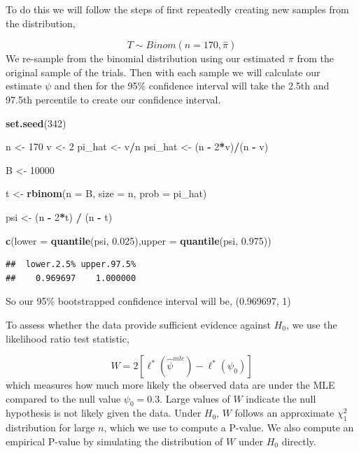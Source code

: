\documentclass[
  11pt,
]{article}
\newenvironment{Shaded}{\begin{snugshade}}{\end{snugshade}}
\newcommand{\AttributeTok}[1]{\textcolor[rgb]{0.13,0.29,0.53}{#1}}
\newcommand{\DecValTok}[1]{\textcolor[rgb]{0.00,0.00,0.81}{#1}}
\newcommand{\FloatTok}[1]{\textcolor[rgb]{0.00,0.00,0.81}{#1}}
\newcommand{\FunctionTok}[1]{\textcolor[rgb]{0.13,0.29,0.53}{\textbf{#1}}}
\newcommand{\NormalTok}[1]{#1}
\newcommand{\OtherTok}[1]{\textcolor[rgb]{0.56,0.35,0.01}{#1}}
\newcommand{\SpecialCharTok}[1]{\textcolor[rgb]{0.81,0.36,0.00}{\textbf{#1}}}
\begin{document}
To do this we will follow the steps of first repeatedly creating new
samples from the distribution,

\[T \sim Binom(n = 170,  \hat \pi)\] We re-sample from the binomial
distribution using our estimated \(\pi\) from the original sample of the
trials. Then with each sample we will calculate our estimate \(\psi\)
and then for the 95\% confidence interval will take the 2.5th and 97.5th
percentile to create our confidence interval.

\begin{Shaded}
\begin{Highlighting}[]
\FunctionTok{set.seed}\NormalTok{(}\DecValTok{342}\NormalTok{)}

\NormalTok{n }\OtherTok{\textless{}{-}} \DecValTok{170}
\NormalTok{v }\OtherTok{\textless{}{-}} \DecValTok{2}
\NormalTok{pi\_hat }\OtherTok{\textless{}{-}}\NormalTok{ v}\SpecialCharTok{/}\NormalTok{n}
\NormalTok{psi\_hat }\OtherTok{\textless{}{-}}\NormalTok{ (n }\SpecialCharTok{{-}} \DecValTok{2}\SpecialCharTok{*}\NormalTok{v)}\SpecialCharTok{/}\NormalTok{(n }\SpecialCharTok{{-}}\NormalTok{ v)}

\NormalTok{B }\OtherTok{\textless{}{-}} \DecValTok{10000}

\NormalTok{t }\OtherTok{\textless{}{-}} \FunctionTok{rbinom}\NormalTok{(}\AttributeTok{n =}\NormalTok{ B, }\AttributeTok{size =}\NormalTok{ n, }\AttributeTok{prob =}\NormalTok{ pi\_hat)}

\NormalTok{psi }\OtherTok{\textless{}{-}}\NormalTok{ (n }\SpecialCharTok{{-}} \DecValTok{2}\SpecialCharTok{*}\NormalTok{t) }\SpecialCharTok{/}\NormalTok{ (n }\SpecialCharTok{{-}}\NormalTok{ t)}

\FunctionTok{c}\NormalTok{(}\AttributeTok{lower =} \FunctionTok{quantile}\NormalTok{(psi, }\FloatTok{0.025}\NormalTok{),}\AttributeTok{upper =} \FunctionTok{quantile}\NormalTok{(psi, }\FloatTok{0.975}\NormalTok{))}
\end{Highlighting}
\end{Shaded}

\begin{verbatim}
##  lower.2.5% upper.97.5% 
##    0.969697    1.000000
\end{verbatim}

So our 95\% bootstrapped confidence interval will be, (0.969697, 1)

To assess whether the data provide sufficient evidence against \(H_0\),
we use the likelihood ratio test statistic,

\[W = 2[\ell^*(\hat{\psi}^{mle}) - \ell^*(\psi_0)]\] which measures how
much more likely the observed data are under the MLE compared to the
null value \(\psi_0 = 0.3\). Large values of \(W\) indicate the null
hypothesis is not likely given the data. Under \(H_0\), \(W\) follows an
approximate \(\chi^2_1\) distribution for large \(n\), which we use to
compute a P-value. We also compute an empirical P-value by simulating
the distribution of \(W\) under \(H_0\) directly.
\end{document}
